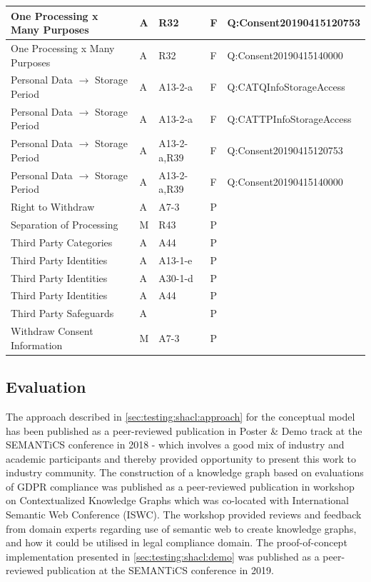 \begin{center}
\begin{tabularx}{\linewidth}{|l|X|X|X|l|}
\rowcolor{lightred} One Processing x Many Purposes & A & R32 & F & Q:Consent20190415120753 \\ \hline
\rowcolor{lightred} One Processing x Many Purposes & A & R32 & F & Q:Consent20190415140000 \\ \hline
\rowcolor{lightred} Personal Data $\rightarrow$ Storage Period & A & A13-2-a & F & Q:CATQInfoStorageAccess \\ \hline
\rowcolor{lightred} Personal Data $\rightarrow$ Storage Period & A & A13-2-a & F & Q:CATTPInfoStorageAccess \\ \hline
\rowcolor{lightred} Personal Data $\rightarrow$ Storage Period & A & A13-2-a,R39 & F & Q:Consent20190415120753 \\ \hline
\rowcolor{lightred} Personal Data $\rightarrow$ Storage Period & A & A13-2-a,R39 & F & Q:Consent20190415140000 \\ \hline
Right to Withdraw & A & A7-3 & P &  \\ \hline
Separation of Processing & M & R43 & P &  \\ \hline
Third Party Categories & A & A44 & P &  \\ \hline
Third Party Identities & A & A13-1-e & P &  \\ \hline
Third Party Identities & A & A30-1-d & P &  \\ \hline
Third Party Identities & A & A44 & P &  \\ \hline
Third Party Safeguards & A &  & P &  \\ \hline
Withdraw Consent Information & M & A7-3 & P &  \\
\bottomrule
\end{tabularx}
\end{center}

\subsection{Evaluation}
The approach described in \autoref{sec:testing:shacl:approach} for the conceptual model has been published as a peer-reviewed publication \cite{pandit_exploring_2018} in Poster \& Demo track at the SEMANTiCS conference in 2018 - which involves a good mix of industry and academic participants and thereby provided opportunity to present this work to industry community.
The construction of a knowledge graph based on evaluations of GDPR compliance was published as a peer-reviewed publication \cite{pandit_towards_2018} in  workshop on Contextualized Knowledge Graphs which was co-located with International Semantic Web Conference (ISWC). The workshop provided reviews and feedback from domain experts regarding use of semantic web to create knowledge graphs, and how it could be utilised in legal compliance domain. 
The proof-of-concept implementation presented in \autoref{sec:testing:shacl:demo} was published as a peer-reviewed publication \cite{pandit_test-driven_2019} at the SEMANTiCS conference in 2019.

